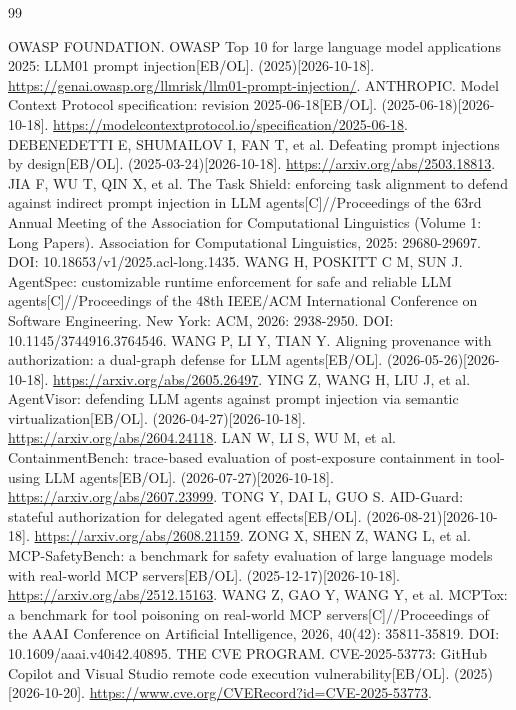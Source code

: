 \begin{thebibliography}{99}
\raggedright
{}
 OWASP FOUNDATION. OWASP Top 10 for large language model applications 2025: LLM01 prompt injection[EB/OL]. (2025)[2026-10-18]. \url{https://genai.owasp.org/llmrisk/llm01-prompt-injection/}.
 ANTHROPIC. Model Context Protocol specification: revision 2025-06-18[EB/OL]. (2025-06-18)[2026-10-18]. \url{https://modelcontextprotocol.io/specification/2025-06-18}.
 DEBENEDETTI E, SHUMAILOV I, FAN T, et al. Defeating prompt injections by design[EB/OL]. (2025-03-24)[2026-10-18]. \url{https://arxiv.org/abs/2503.18813}.
 JIA F, WU T, QIN X, et al. The Task Shield: enforcing task alignment to defend against indirect prompt injection in LLM agents[C]//Proceedings of the 63rd Annual Meeting of the Association for Computational Linguistics (Volume 1: Long Papers). Association for Computational Linguistics, 2025: 29680-29697. DOI: 10.18653/v1/2025.acl-long.1435.
 WANG H, POSKITT C M, SUN J. AgentSpec: customizable runtime enforcement for safe and reliable LLM agents[C]//Proceedings of the 48th IEEE/ACM International Conference on Software Engineering. New York: ACM, 2026: 2938-2950. DOI: 10.1145/3744916.3764546.
 WANG P, LI Y, TIAN Y. Aligning provenance with authorization: a dual-graph defense for LLM agents[EB/OL]. (2026-05-26)[2026-10-18]. \url{https://arxiv.org/abs/2605.26497}.
 YING Z, WANG H, LIU J, et al. AgentVisor: defending LLM agents against prompt injection via semantic virtualization[EB/OL]. (2026-04-27)[2026-10-18]. \url{https://arxiv.org/abs/2604.24118}.
 LAN W, LI S, WU M, et al. ContainmentBench: trace-based evaluation of post-exposure containment in tool-using LLM agents[EB/OL]. (2026-07-27)[2026-10-18]. \url{https://arxiv.org/abs/2607.23999}.
 TONG Y, DAI L, GUO S. AID-Guard: stateful authorization for delegated agent effects[EB/OL]. (2026-08-21)[2026-10-18]. \url{https://arxiv.org/abs/2608.21159}.
 ZONG X, SHEN Z, WANG L, et al. MCP-SafetyBench: a benchmark for safety evaluation of large language models with real-world MCP servers[EB/OL]. (2025-12-17)[2026-10-18]. \url{https://arxiv.org/abs/2512.15163}.
 WANG Z, GAO Y, WANG Y, et al. MCPTox: a benchmark for tool poisoning on real-world MCP servers[C]//Proceedings of the AAAI Conference on Artificial Intelligence, 2026, 40(42): 35811-35819. DOI: 10.1609/aaai.v40i42.40895.
 THE CVE PROGRAM. CVE-2025-53773: GitHub Copilot and Visual Studio remote code execution vulnerability[EB/OL]. (2025)[2026-10-20]. \url{https://www.cve.org/CVERecord?id=CVE-2025-53773}.

\end{thebibliography}
